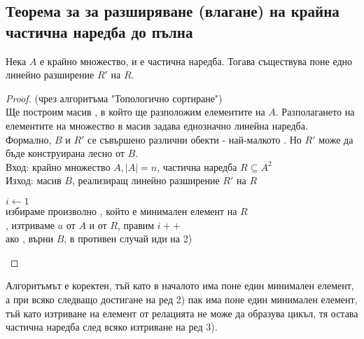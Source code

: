 \subsection{Теорема за за разширяване (влагане) на крайна частична наредба до пълна}
\begin{theorem}
    Нека \(A\) е крайно множество,  и  е частична наредба. Тогава 
    съществува поне едно линейно разширение \(R'\) на \(R\).
\end{theorem}
\begin{proof}
    (чрез алгоритъма "Топологично сортиране") \\
    Ще построим масив , в който ще разположим елементите на \(A\). Разполагането на 
    елементите на множество в масив задава еднозначно линейна наредба. \\
    Формално, \(B\) и \(R'\) се съвършено различни обекти - най-малкото 
    . Но \(R'\) може да бъде конструирана лесно от \(B\). \\

    Вход: крайно множество \(A, |A| = n\), частична наредба \(R \subseteq A^2\) \\
    Изход: масив \(B\), реализиращ линейно разширение \(R'\) на \(R\)
    \begin{algorithmic}[1]
        \State $i \gets 1$ \\
        избираме произволно , който е минимален елемент на \(R\) \\
        , изтриваме \(a\) от \(A\) и от \(R\), правим \(i++\) \\
        ако , върни \(B\), в противен случай иди на 2)
    \end{algorithmic}
\end{proof}

Алгоритъмът е коректен, тъй като в началото има поне един минимален елемент, а при всяко следващо достигане 
на ред 2) пак има поне един минимален елемент, тъй като изтриване на елемент от релацията не може да 
образува цикъл, тя остава частична наредба след всяко изтриване на ред 3).
